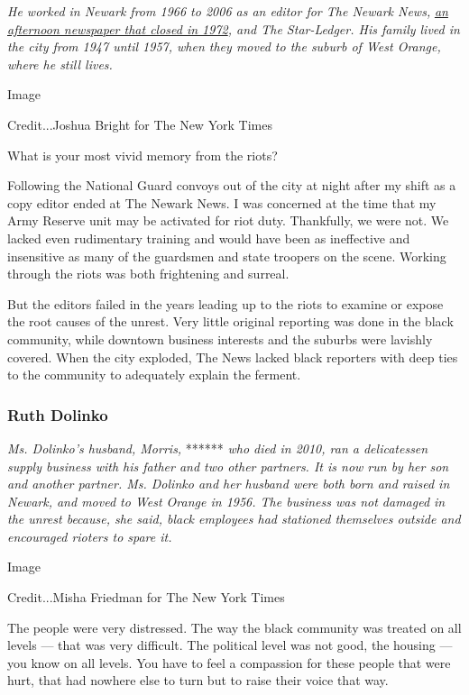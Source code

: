 \emph{He worked in Newark from 1966 to 2006 as an editor for The Newark
News,}
\href{http://www.nytimes.com/1981/08/30/nyregion/the-newark-news-in-memoriam.html}{\emph{an
afternoon newspaper that closed in 1972}}\emph{, and The Star-Ledger.
His family lived in the city from 1947 until 1957, when they moved to
the suburb of West Orange, where he still lives.}

Image

Credit...Joshua Bright for The New York Times

What is your most vivid memory from the riots?

Following the National Guard convoys out of the city at night after my
shift as a copy editor ended at The Newark News. I was concerned at the
time that my Army Reserve unit may be activated for riot duty.
Thankfully, we were not. We lacked even rudimentary training and would
have been as ineffective and insensitive as many of the guardsmen and
state troopers on the scene. Working through the riots was both
frightening and surreal.

But the editors failed in the years leading up to the riots to examine
or expose the root causes of the unrest. Very little original reporting
was done in the black community, while downtown business interests and
the suburbs were lavishly covered. When the city exploded, The News
lacked black reporters with deep ties to the community to adequately
explain the ferment.

\hypertarget{ruth-dolinko}{%
\subsubsection{Ruth Dolinko}\label{ruth-dolinko}}

\emph{Ms. Dolinko's husband, Morris,} ****** \emph{who died in 2010, ran
a delicatessen supply business with his father and two other partners.
It is now run by her son and another partner. Ms. Dolinko and her
husband were both born and raised in Newark, and moved to West Orange in
1956. The business was not damaged in the unrest because, she said,
black employees had stationed themselves outside and encouraged rioters
to spare it.}

Image

Credit...Misha Friedman for The New York Times

The people were very distressed. The way the black community was treated
on all levels --- that was very difficult. The political level was not
good, the housing --- you know on all levels. You have to feel a
compassion for these people that were hurt, that had nowhere else to
turn but to raise their voice that way.


